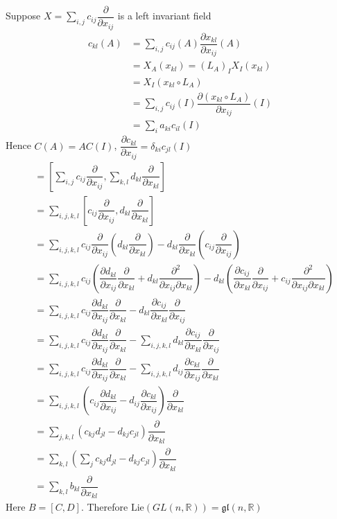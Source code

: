 \documentclass[main]{subfiles}
\begin{document}
\begin{example}
Suppose $X=\displaystyle\sum_{i,j}c_{ij}\dfrac{\partial}{\partial x_{ij}}$ is a left invariant field
\begin{align*}
c_{kl}(A)&=\sum_{i,j}c_{ij}(A)\dfrac{\partial x_{kl}}{\partial x_{ij}}(A) \\
&=X_A(x_{kl})=(L_A)_IX_I(x_{kl}) \\
&=X_I(x_{kl}\circ L_A) \\
&=\sum_{i,j}c_{ij}(I)\dfrac{\partial (x_{kl}\circ L_A)}{\partial x_{ij}}(I) \\
&=\sum_{i}a_{ki}c_{il}(I)
\end{align*}
Hence $C(A)=AC(I)$, $\dfrac{\partial c_{kl}}{\partial x_{ij}}=\delta_{ki}c_{jl}(I)$
\begin{align*}
[X,Y]&=\displaystyle\left[\sum_{i,j}c_{ij}\dfrac{\partial}{\partial x_{ij}},\sum_{k,l}d_{kl}\dfrac{\partial}{\partial x_{kl}}\right] \\
&=\sum_{i,j,k,l}\left[c_{ij}\dfrac{\partial}{\partial x_{ij}},d_{kl}\dfrac{\partial}{\partial x_{kl}}\right] \\
&=\sum_{i,j,k,l}c_{ij}\dfrac{\partial}{\partial x_{ij}}\left(d_{kl}\dfrac{\partial}{\partial x_{kl}}\right)-d_{kl}\dfrac{\partial}{\partial x_{kl}}\left(c_{ij}\dfrac{\partial}{\partial x_{ij}}\right) \\
&=\sum_{i,j,k,l}c_{ij}\left(\dfrac{\partial d_{kl}}{\partial x_{ij}}\dfrac{\partial}{\partial x_{kl}}+d_{kl}\dfrac{\partial^2}{\partial x_{ij}\partial x_{kl}}\right)-d_{kl}\left(\dfrac{\partial c_{ij}}{\partial x_{kl}}\dfrac{\partial}{\partial x_{ij}}+c_{ij}\dfrac{\partial^2}{\partial x_{ij}\partial x_{kl}}\right) \\
&=\sum_{i,j,k,l}c_{ij}\dfrac{\partial d_{kl}}{\partial x_{ij}}\dfrac{\partial}{\partial x_{kl}}-d_{kl}\dfrac{\partial c_{ij}}{\partial x_{kl}}\dfrac{\partial}{\partial x_{ij}} \\
&=\sum_{i,j,k,l}c_{ij}\dfrac{\partial d_{kl}}{\partial x_{ij}}\dfrac{\partial}{\partial x_{kl}}-\sum_{i,j,k,l}d_{kl}\dfrac{\partial c_{ij}}{\partial x_{kl}}\dfrac{\partial}{\partial x_{ij}} \\
&=\sum_{i,j,k,l}c_{ij}\dfrac{\partial d_{kl}}{\partial x_{ij}}\dfrac{\partial}{\partial x_{kl}}-\sum_{i,j,k,l}d_{ij}\dfrac{\partial c_{kl}}{\partial x_{ij}}\dfrac{\partial}{\partial x_{kl}} \\
&=\sum_{i,j,k,l}\left(c_{ij}\dfrac{\partial d_{kl}}{\partial x_{ij}}-d_{ij}\dfrac{\partial c_{kl}}{\partial x_{ij}}\right)\dfrac{\partial}{\partial x_{kl}} \\
&=\sum_{j,k,l}\left(c_{kj}d_{jl}-d_{kj}c_{jl}\right)\dfrac{\partial}{\partial x_{kl}} \\
&=\sum_{k,l}\left(\sum_{j}c_{kj}d_{jl}-d_{kj}c_{jl}\right)\dfrac{\partial}{\partial x_{kl}} \\
&=\sum_{k,l}b_{kl}\dfrac{\partial}{\partial x_{kl}}
\end{align*}
Here $B=[C,D]$. Therefore $\mathrm{Lie}(GL(n,\mathbb R))=\mathfrak{gl}(n,\mathbb R)$
\end{example}
\end{document}
